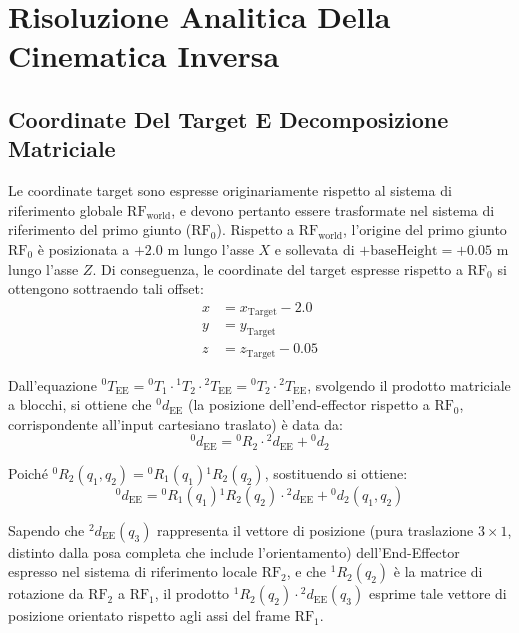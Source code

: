 \documentclass[11pt, a4paper]{report}
\begin{document}
\tableofcontents
\cleardoublepage


\chapter{Risoluzione Analitica Della Cinematica Inversa}
\label{chap:cinematica_inversa}

\section{Coordinate Del Target E Decomposizione Matriciale}
Le coordinate target sono espresse originariamente rispetto al sistema di riferimento globale $\text{RF}_{\text{world}}$, e devono pertanto essere trasformate nel sistema di riferimento del primo giunto ($\text{RF}_0$). Rispetto a $\text{RF}_{\text{world}}$, l'origine del primo giunto $\text{RF}_0$ è posizionata a $+2.0\text{ m}$ lungo l'asse $X$ e sollevata di $+\text{baseHeight} = +0.05\text{ m}$ lungo l'asse $Z$. Di conseguenza, le coordinate del target espresse rispetto a $\text{RF}_0$ si ottengono sottraendo tali offset:
\begin{align*}
x &= x_{\text{Target}} - 2.0 \\
y &= y_{\text{Target}} \\
z &= z_{\text{Target}} - 0.05
\end{align*}

Dall'equazione ${}^{0}T_{\text{EE}} = {}^{0}T_{1} \cdot {}^{1}T_{2} \cdot {}^{2}T_{\text{EE}} = {}^{0}T_{2} \cdot {}^{2}T_{\text{EE}}$, svolgendo il prodotto matriciale a blocchi, si ottiene che ${}^{0}d_{\text{EE}}$ (la posizione dell'end-effector rispetto a $\text{RF}_0$, corrispondente all'input cartesiano traslato) è data da:
\[
{}^{0}d_{\text{EE}} = {}^{0}R_{2} \cdot {}^{2}d_{\text{EE}} + {}^{0}d_{2}
\]

Poiché ${}^{0}R_{2}(q_1, q_2) = {}^{0}R_{1}(q_1){}^{1}R_{2}(q_2)$, sostituendo si ottiene:
\[
{}^{0}d_{\text{EE}} = {}^{0}R_{1}(q_1){}^{1}R_{2}(q_2) \cdot {}^{2}d_{\text{EE}} + {}^{0}d_{2}(q_1, q_2)
\]

Sapendo che ${}^{2}d_{\text{EE}}(q_3)$ rappresenta il vettore di posizione (pura traslazione $3 \times 1$, distinto dalla posa completa che include l'orientamento) dell'End-Effector espresso nel sistema di riferimento locale $\text{RF}_2$, e che ${}^{1}R_{2}(q_2)$ è la matrice di rotazione da $\text{RF}_2$ a $\text{RF}_1$, il prodotto ${}^{1}R_{2}(q_2) \cdot {}^{2}d_{\text{EE}}(q_3)$ esprime tale vettore di posizione orientato rispetto agli assi del frame $\text{RF}_1$.
\end{document}
